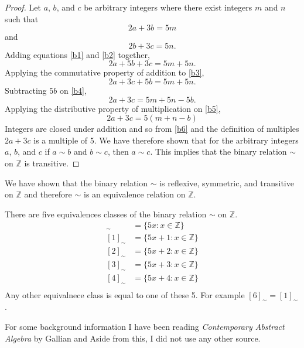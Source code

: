 \documentclass[12pt]{article}
\begin{document}
\begin{proof}
Let $a$, $b$, and $c$ be arbitrary integers where there exist integers $m$ and $n$ such that
\begin{equation}\label{b1}
2a + 3b = 5m
\end{equation}
and
\begin{equation}\label{b2}
2b + 3c = 5n.
\end{equation}
Adding equations \eqref{b1} and \eqref{b2} together,
\begin{equation}\label{b3}
2a + 5b +3c = 5m + 5n.
\end{equation}
Applying the commutative property of addition to \eqref{b3},
\begin{equation}\label{b4}
2a + 3c + 5b = 5m + 5n.
\end{equation}
Subtracting $5b$ on \eqref{b4},
\begin{equation}\label{b5}
2a + 3c = 5m + 5n - 5b.
\end{equation}
Applying the distributive property of multiplication on \eqref{b5},
\begin{equation}\label{b6}
2a + 3c = 5(m+n-b)
\end{equation}
Integers are closed under addition and so from \eqref{b6} and the definition of multiples $2a + 3c$ is a multiple of 5. We have therefore shown that for the arbitrary integers $a$, $b$, and $c$ if $a\sim b$ and $b\sim c$, then $a\sim c$. This implies that the binary relation $\sim$ on $\mathbb{Z}$ is transitive.
\end{proof}
We have shown that the binary relation $\sim$ is reflexive, symmetric, and transitive on $\mathbb{Z}$ and therefore $\sim$ is an equivalence relation on $\mathbb{Z}$.

There are five equivalences classes of the binary relation $\sim$ on $\mathbb{Z}$.
\begin{align*}
[0]_\sim &= \{5x: x \in \mathbb{Z}\}\\
[1]_\sim &= \{5x + 1: x \in \mathbb{Z}\}\\
[2]_\sim &= \{5x + 2: x \in \mathbb{Z}\}\\
[3]_\sim &= \{5x + 3: x \in \mathbb{Z}\}\\
[4]_\sim &= \{5x + 4: x \in \mathbb{Z}\}\\
\end{align*}
Any other equivalnece class is equal to one of these 5. For example $[6]_\sim = [1]_\sim$.


For some background information I have been reading {\it Contemporary Abstract Algebra} by Gallian and   Aside from this, I did not use any other source.
\end{document}
